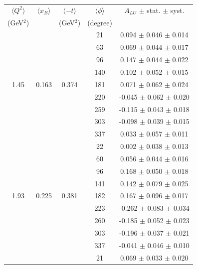 \documentclass{article}
\begin{document}
\begin{table}[!h]
   \begin{center}
      \begin{tabular}{|c|c|c|c|c|}
         \hline
 $\langle Q^{2} \rangle$ & $\langle x_{B} \rangle$ & $\langle -t \rangle$ & $\langle \phi \rangle$ & $A_{LU}$ $\pm$ stat. $\pm$ syst.\\
 (GeV$^{2}$) &           & (GeV$^{2}$) & (degree) &  \\
         \hline
        &       &       &  21    &  0.094  $\pm$ 0.046   $\pm$  0.014  \\ 
        &       &       &  63    &  0.069  $\pm$ 0.044   $\pm$  0.017  \\ 
        &       &       &  96    &  0.147  $\pm$ 0.044   $\pm$  0.022  \\ 
        &       &       & 140    &  0.102  $\pm$ 0.052   $\pm$  0.015  \\ 
  1.45  & 0.163 & 0.374 & 181    &  0.071  $\pm$ 0.062   $\pm$  0.024  \\ 
        &       &       & 220    & -0.045  $\pm$ 0.062   $\pm$  0.020  \\ 
        &       &       & 259    & -0.115  $\pm$ 0.043   $\pm$  0.018  \\ 
        &       &       & 303    & -0.098  $\pm$ 0.039   $\pm$  0.015  \\ 
        &       &       & 337    &  0.033  $\pm$ 0.057   $\pm$  0.011  \\ 
  \hline
        &       &       &  22    &  0.002  $\pm$ 0.038   $\pm$  0.013  \\
        &       &       &  60    &  0.056  $\pm$ 0.044   $\pm$  0.016  \\
        &       &       &  96    &  0.168  $\pm$ 0.050   $\pm$  0.018  \\
        &       &       & 141    &  0.142  $\pm$ 0.079   $\pm$  0.025  \\
  1.93  & 0.225 & 0.381 & 182    &  0.167  $\pm$ 0.096   $\pm$  0.017  \\
        &       &       & 223    & -0.262  $\pm$ 0.083   $\pm$  0.034  \\
        &       &       & 260    & -0.185  $\pm$ 0.052   $\pm$  0.023  \\
        &       &       & 303    & -0.196  $\pm$ 0.037   $\pm$  0.021  \\
        &       &       & 337    & -0.041  $\pm$ 0.046   $\pm$  0.010  \\
  \hline
        &       &       &  21    &  0.069  $\pm$ 0.033   $\pm$  0.020  \\

\end{tabular}
\end{center}
\end{table}
\end{document}
